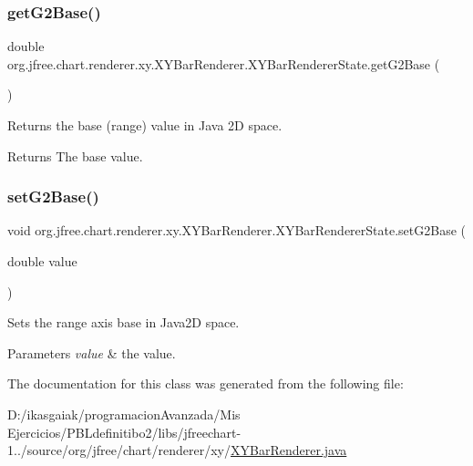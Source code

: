 \subsubsection{\texorpdfstring{get\+G2\+Base()}{getG2Base()}}
{\footnotesize\ttfamily double org.\+jfree.\+chart.\+renderer.\+xy.\+X\+Y\+Bar\+Renderer.\+X\+Y\+Bar\+Renderer\+State.\+get\+G2\+Base (\begin{DoxyParamCaption}{ }\end{DoxyParamCaption})}

Returns the base (range) value in Java 2D space.

\begin{DoxyReturn}{Returns}
The base value. 
\end{DoxyReturn}
\mbox{\label{classorg_1_1jfree_1_1chart_1_1renderer_1_1xy_1_1_x_y_bar_renderer_1_1_x_y_bar_renderer_state_a9a05168db37529b07afe6f0ca4ca1f2e}} 
\subsubsection{\texorpdfstring{set\+G2\+Base()}{setG2Base()}}
{\footnotesize\ttfamily void org.\+jfree.\+chart.\+renderer.\+xy.\+X\+Y\+Bar\+Renderer.\+X\+Y\+Bar\+Renderer\+State.\+set\+G2\+Base (\begin{DoxyParamCaption}\item[{double}]{value }\end{DoxyParamCaption})}

Sets the range axis base in Java2D space.


\begin{DoxyParams}{Parameters}
{\em value} & the value. \\
\hline
\end{DoxyParams}


The documentation for this class was generated from the following file\+:\begin{DoxyCompactItemize}
\item 
D\+:/ikasgaiak/programacion\+Avanzada/\+Mis Ejercicios/\+P\+B\+Ldefinitibo2/libs/jfreechart-\/1../source/org/jfree/chart/renderer/xy/\mbox{\hyperlink{_x_y_bar_renderer_8java}{X\+Y\+Bar\+Renderer.\+java}}\end{DoxyCompactItemize}
